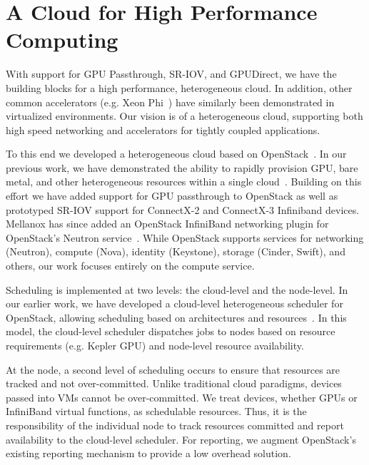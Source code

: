 \section{A Cloud for High Performance Computing}\label{openstack}
With support for GPU Passthrough, SR-IOV, and GPUDirect, we have the building
blocks for a high performance, heterogeneous cloud.  In addition, other common
accelerators (e.g. Xeon Phi~\cite{Phi}) have similarly been demonstrated in
virtualized environments.  Our vision is of a heterogeneous cloud, supporting
both high speed networking and accelerators for tightly coupled applications.

To this end we developed a heterogeneous cloud based on
OpenStack~\cite{www-openstack}.  In our previous work, we
have demonstrated the ability to rapidly provision GPU, bare metal, and other
heterogeneous resources within a single cloud~\cite{crago2011heterogeneous}.
Building on this effort we have added support for GPU passthrough to OpenStack
as well as prototyped SR-IOV support for ConnectX-2 and ConnectX-3 Infiniband devices.
Mellanox  has since added an OpenStack InfiniBand networking plugin for
OpenStack's Neutron service~\cite{ML2}. %
While OpenStack supports services for networking (Neutron), compute (Nova), identity
(Keystone), storage (Cinder, Swift), and others, our work focuses entirely
on the compute service.  

Scheduling is implemented at two levels: the cloud-level and the node-level.  In
our earlier work, we have developed a cloud-level heterogeneous scheduler for OpenStack,
allowing scheduling based on architectures and
resources~\cite{crago2011heterogeneous}.  In this model, the cloud-level
scheduler dispatches jobs to nodes based on resource requirements (e.g. Kepler
GPU) and node-level resource availability.

At the node, a second level of scheduling occurs to ensure that resources are
tracked and not over-committed.  Unlike traditional cloud paradigms, devices
passed into VMs cannot be over-committed.  We treat devices, whether GPUs or
InfiniBand virtual functions, as schedulable resources.  Thus, it is the responsibility of the
individual node to track resources committed and report availability to the
cloud-level scheduler.  For reporting, we augment OpenStack's
existing reporting mechanism to provide a low overhead solution.


